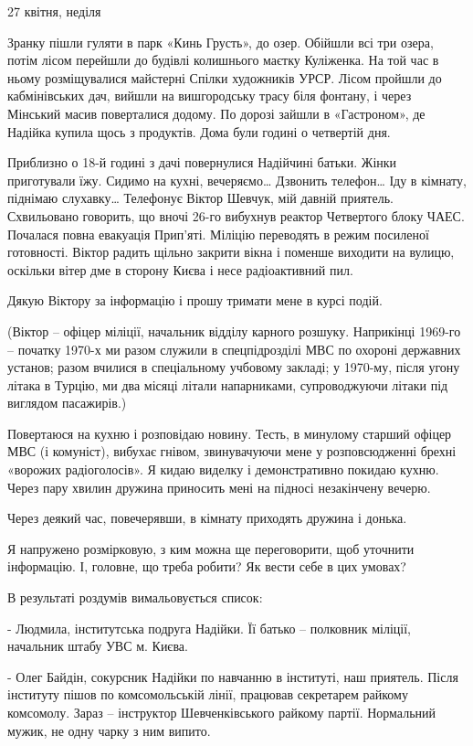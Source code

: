 27 квітня, неділя 

Зранку пішли гуляти в парк «Кинь Грусть», до озер. Обійшли всі три озера, потім
лісом перейшли до будівлі колишнього маєтку Куліженка. На той час в ньому
розміщувалися майстерні Спілки художників УРСР. Лісом пройшли до кабмінівських
дач, вийшли на вишгородську трасу біля фонтану, і через Мінський масив
поверталися додому. По дорозі зайшли в «Гастроном», де Надійка купила щось з
продуктів. Дома були годині о четвертій дня. 

Приблизно о 18-й годині з дачі повернулися Надійчині батьки. Жінки приготували
їжу. Сидимо на кухні, вечеряємо… Дзвонить телефон… Іду в кімнату, піднімаю
слухавку… Телефонує Віктор Шевчук, мій давній приятель. Схвильовано говорить,
що вночі 26-го вибухнув реактор Четвертого блоку ЧАЕС. Почалася повна евакуація
Прип’яті. Міліцію переводять в режим посиленої готовності. Віктор радить щільно
закрити вікна і поменше виходити на вулицю, оскільки вітер дме в сторону Києва
і несе радіоактивний пил. 

Дякую Віктору за інформацію і прошу тримати мене в курсі подій.

(Віктор – офіцер міліції, начальник відділу карного розшуку. Наприкінці 1969-го
– початку 1970-х ми разом служили в спецпідрозділі МВС по охороні державних
установ; разом вчилися в спеціальному учбовому закладі; у 1970-му, після угону
літака в Турцію, ми два місяці літали напарниками, супроводжуючи літаки під
виглядом пасажирів.) 

Повертаюся на кухню і розповідаю новину. Тесть, в минулому старший офіцер МВС
(і комуніст), вибухає гнівом, звинувачуючи мене у розповсюдженні брехні
«ворожих радіоголосів». Я кидаю виделку і демонстративно покидаю кухню. Через
пару хвилин дружина приносить мені на підносі незакінчену вечерю.

Через деякий час, повечерявши, в кімнату приходять дружина і донька. 

Я напружено розмірковую, з ким можна ще переговорити, щоб уточнити інформацію.
І, головне, що треба робити? Як вести себе в цих умовах?

В результаті роздумів вимальовується список:

- Людмила, інститутська подруга Надійки. Її батько – полковник міліції,
начальник штабу УВС м. Києва.

- Олег Байдін, сокурсник Надійки по навчанню в інституті, наш приятель. Після
інституту пішов по комсомольській лінії, працював секретарем райкому комсомолу.
Зараз – інструктор Шевченківського райкому партії. Нормальний мужик, не одну
чарку з ним випито. 


